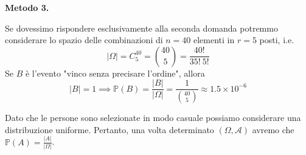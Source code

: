 \textbf{Metodo 3.}

Se dovessimo rispondere esclusivamente alla seconda domanda potremmo considerare lo spazio delle combinazioni di $n=40$ elementi in $r=5$ posti, i.e.
\begin{equation*}
| \Omega | =C_{5}^{40} =\binom{40}{5} =\frac{40!}{35!\ 5!}
\end{equation*}
Se $B$ è l'evento "vinco senza precisare l'ordine", allora
\begin{equation*}
| B| =1\implies \mathbb{P}( B) =\frac{| B| }{| \Omega | } =\frac{1}{\binom{40}{5}} \approx 1.5\times 10^{-6}
\end{equation*}
\Soluzione

Dato che le persone sono selezionate in modo casuale possiamo considerare una distribuzione uniforme. Pertanto, una volta determinato $( \Omega ,\mathcal{A})$ avremo che $\mathbb{P}( A) =\frac{| A| }{| \Omega | }$.

